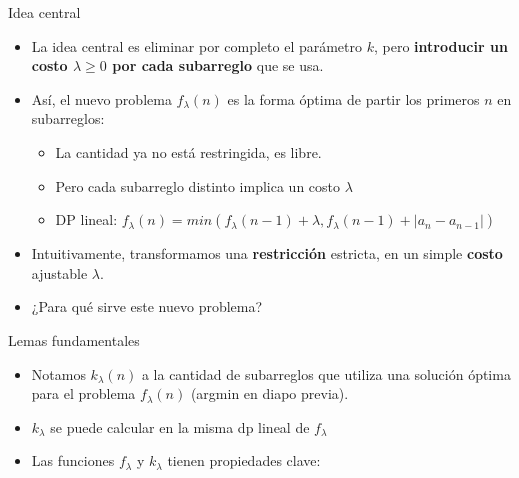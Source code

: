 \documentclass{beamer}
\begin{document}
\begin{frame}{Idea central}
    \begin{itemize}
		\item La idea central es eliminar por completo el parámetro $k$, pero \textbf{introducir un costo $\lambda \geq 0$ por cada subarreglo} que se usa.
        \item Así, el nuevo problema $f_\lambda(n)$ es la forma óptima de partir los primeros $n$ en subarreglos:
            \begin{itemize}
                \item La cantidad ya no está restringida, es libre.
                \item Pero cada subarreglo distinto implica un costo $\lambda$
                \item DP lineal: $f_{\lambda}(n) = min(f_{\lambda}(n-1) + \lambda, f_{\lambda}(n-1) + |a_n - a_{n-1}|)$
            \end{itemize}
        \item Intuitivamente, transformamos una \textbf{restricción} estricta, en un simple \textbf{costo} ajustable $\lambda$.
        \item ¿Para qué sirve este nuevo problema?
    \end{itemize}
\end{frame}

\begin{frame}{Lemas fundamentales}
    \begin{itemize}
		\item Notamos $k_\lambda(n)$ a la cantidad de subarreglos que utiliza una solución óptima para el problema $f_\lambda(n)$ (argmin en diapo previa).
        \item $k_\lambda$ se puede calcular en la misma dp lineal de $f_\lambda$
        \item Las funciones $f_\lambda$ y $k_\lambda$ tienen propiedades clave:
         \pause
    \end{itemize}
\end{frame}
\end{document}
